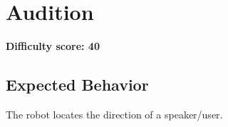 \section{Audition}

\textbf{Difficulty score: 40}

\subsection{Expected Behavior}
The robot locates the direction of a speaker/user.



